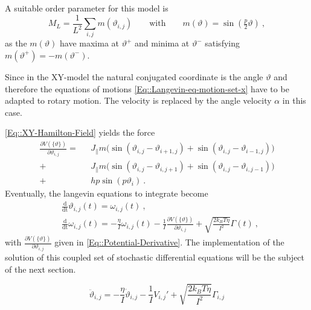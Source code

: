 	A suitable order parameter for this model is
	\begin{equation} \label{Eq::Si-Order-Param}
		M_L =	\frac{1}{L^2} \sum_{i,j} m(\vartheta_{i, j}) \qquad \text{with} \qquad	m(\vartheta) =	\sin \left(\tfrac{p}{2} \vartheta\right) ~,
	\end{equation}
	as the $m(\vartheta)$ have maxima at $\vartheta^{+}$ and minima at $\vartheta^{-}$ satisfying $m(\vartheta^+) =	- m (\vartheta^-)$.
	
	Since in the XY-model the natural conjugated coordinate is the angle $\vartheta$ and therefore the equations of motions \autoref{Eq::Langevin-eq-motion-set-x} have to be adapted to rotary motion. The velocity is replaced by the angle velocity $\alpha$ in this case.
	
	\autoref{Eq::XY-Hamilton-Field} yields the force
	\begin{equation} \label{Eq::Potential-Derivative}
		\begin{split}
			\frac{\partial V(\{\vartheta\})}{\partial \vartheta_{i, j}} = ~~~& J_\parallel m \Big( \sin \left(\vartheta_{i,j} - \vartheta_{i + 1, j} \right) +   \sin \left(\vartheta_{i,j} - \vartheta_{i-1, j} \right) \Big)	 \\
			+ &J_\parallel m \Big( \sin \left(\vartheta_{i,j} - \vartheta_{i, j+1} \right) +  \sin \left(\vartheta_{i,j} - \vartheta_{i, j-1} \right) \Big) \\
			+ &h p \sin(p\vartheta_i)~.
		\end{split}
	\end{equation}
	Eventually, the langevin equations to integrate become
	\begin{align}
		&\frac{\text{d}}{\text{dt}} \vartheta_{i,j}(t) =	 \omega_{i,j}(t)~, \label{Eq::Si-Langevin-theta} \\
		&\frac{\text{d}}{\text{dt}} \omega_{i,j}(t) =	- \frac{\eta}{I} \omega_{i,j}(t) - \frac{1}{I}\frac{\partial V(\{\vartheta\})}{\partial \vartheta_{i,j}} + \sqrt{\frac{2 k_B T \eta}{I^2}} \Gamma(t)~, \label{Eq::Si-Langevin-omega}
	\end{align}
	with $\frac{\partial V(\{\vartheta\})}{\partial \vartheta_{i,j}}$ given in \autoref{Eq::Potential-Derivative}. The implementation of the solution of this coupled set of stochastic differential equations will be the subject of the next section.
	
	\begin{equation}
		\ddot{\vartheta}_{i, j} =	- \frac{\eta}{I} \dot{\vartheta}_{i, j} - \frac{1}{I} V_{i,j}' + \sqrt{\frac{2 k_B T \eta}{I^2}} \Gamma_{i,j}
	\end{equation}
